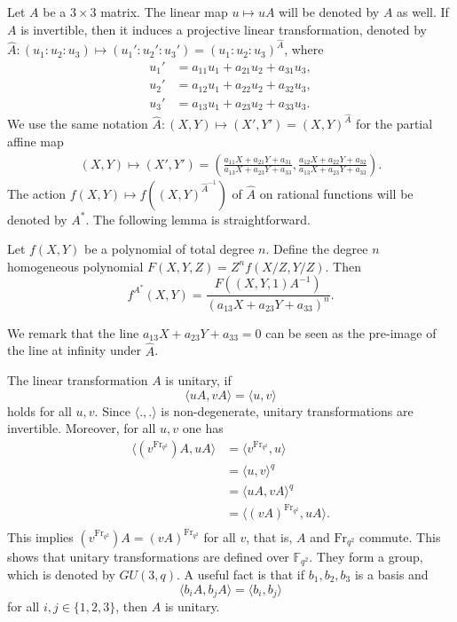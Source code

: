 \documentclass[entropy,article,submit,pdftex,moreauthors]{Definitions/mdpi}
\newcommand{\Frob}{{\mathrm{Fr}_{q^2}}}
\begin{document}
Let $A$ be a $3\times 3$ matrix. The linear map $u\mapsto uA$ will be denoted by $A$ as well. If $A$ is invertible, then it induces a projective linear transformation, denoted by $\hat{A}:(u_1:u_2:u_3)\mapsto (u_1':u_2':u_3')=(u_1:u_2:u_3)^{\hat{A}}$, where
\begin{align*} %
u_1' &= a_{11}u_1+a_{21}u_2+a_{31}u_3, \\
u_2' &= a_{12}u_1+a_{22}u_2+a_{32}u_3, \\
u_3' &= a_{13}u_1+a_{23}u_2+a_{33}u_3. 
\end{align*}
We use the same notation $\hat{A}:(X,Y) \mapsto (X',Y')=(X,Y)^{\hat{A}}$ for the partial affine map
\begin{align*} %
(X,Y) \mapsto (X',Y') = \left(\frac{a_{11}X+a_{21}Y+a_{31}}{a_{13}X+a_{23}Y+a_{33}}, \frac{a_{12}X+a_{22}Y+a_{32}}{a_{13}X+a_{23}Y+a_{33}}\right).
\end{align*}
The action $f(X,Y) \mapsto f((X,Y)^{\hat{A}^{-1}})$ of $\hat{A}$ on rational functions will be denoted by $A^*$. The following lemma is straightforward.
\begin{Lemma} \label{lm:f-action}
Let $f(X,Y)$ be a polynomial of total degree $n$. Define the degree $n$ homogeneous polynomial $F(X,Y,Z)=Z^n f(X/Z,Y/Z)$. Then
\[f^{A^*}(X,Y)=\frac{F((X,Y,1)A^{-1})}{(a_{13}X+a_{23}Y+a_{33})^n}.\]
\end{Lemma}
We remark that the line $a_{13}X+a_{23}Y+a_{33}=0$ can be seen as the pre-image of the line at infinity under $\hat{A}$. 

The linear transformation $A$ is unitary, if
\[\langle uA, vA \rangle = \langle u,v \rangle\]
holds for all $u,v$. Since $\langle .,. \rangle$ is non-degenerate, unitary transformations are invertible. Moreover, for all $u,v$ one has
\begin{align*}
\langle (v^\Frob)A, uA \rangle &= \langle v^\Frob,u \rangle \\
&= \langle u,v \rangle^q \\
&= \langle uA,vA \rangle^q \\
&= \langle (vA)^\Frob,uA \rangle. \\
\end{align*}
This implies $(v^\Frob)A = (vA)^\Frob$ for all $v$, that is, $A$ and $\Frob$ commute. This shows that unitary transformations are defined over $\mathbb{F}_{q^2}$. They form a group, which is denoted by $GU(3,q)$. A useful fact is that if $b_1,b_2,b_3$ is a basis and
\[\langle b_iA, b_jA \rangle = \langle b_i,b_j \rangle\]
for all $i,j\in \{1,2,3\}$, then $A$ is unitary. 
\end{document}
